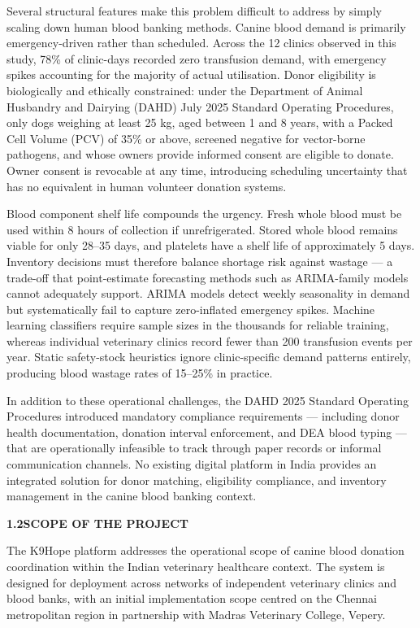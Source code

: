 \documentclass[12pt,a4paper]{article}
\begin{document}
\noindent Several structural features make this problem difficult to address by simply scaling down human blood banking methods. Canine blood demand is primarily emergency-driven rather than scheduled. Across the 12 clinics observed in this study, 78\% of clinic-days recorded zero transfusion demand, with emergency spikes accounting for the majority of actual utilisation. Donor eligibility is biologically and ethically constrained: under the Department of Animal Husbandry and Dairying (DAHD) July 2025 Standard Operating Procedures, only dogs weighing at least 25 kg, aged between 1 and 8 years, with a Packed Cell Volume (PCV) of 35\% or above, screened negative for vector-borne pathogens, and whose owners provide informed consent are eligible to donate. Owner consent is revocable at any time, introducing scheduling uncertainty that has no equivalent in human volunteer donation systems.

\noindent Blood component shelf life compounds the urgency. Fresh whole blood must be used within 8 hours of collection if unrefrigerated. Stored whole blood remains viable for only 28--35 days, and platelets have a shelf life of approximately 5 days. Inventory decisions must therefore balance shortage risk against wastage — a trade-off that point-estimate forecasting methods such as ARIMA-family models cannot adequately support. ARIMA models detect weekly seasonality in demand but systematically fail to capture zero-inflated emergency spikes. Machine learning classifiers require sample sizes in the thousands for reliable training, whereas individual veterinary clinics record fewer than 200 transfusion events per year. Static safety-stock heuristics ignore clinic-specific demand patterns entirely, producing blood wastage rates of 15--25\% in practice.

\noindent In addition to these operational challenges, the DAHD 2025 Standard Operating Procedures introduced mandatory compliance requirements — including donor health documentation, donation interval enforcement, and DEA blood typing — that are operationally infeasible to track through paper records or informal communication channels. No existing digital platform in India provides an integrated solution for donor matching, eligibility compliance, and inventory management in the canine blood banking context.

\vspace{2em}
\noindent\textbf{1.2\quad SCOPE OF THE PROJECT}
\vspace{0.8em}

\noindent The K9Hope platform addresses the operational scope of canine blood donation coordination within the Indian veterinary healthcare context. The system is designed for deployment across networks of independent veterinary clinics and blood banks, with an initial implementation scope centred on the Chennai metropolitan region in partnership with Madras Veterinary College, Vepery.
\end{document}
